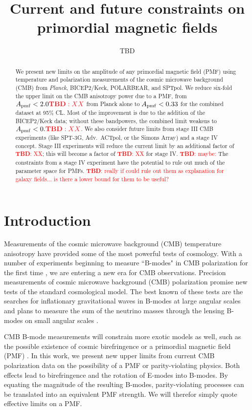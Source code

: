 \documentclass[preprint]{emulateapj}
\newcommand{\apmf}{\ensuremath{A_{\rm pmf}}}
\newcommand{\planck}{{\sl Planck}}
\newcommand{\bicepkeck}{BICEP2/Keck}
\newcommand{\sptnew}{SPT-3G}
\newcommand{\pb}{POLARBEAR}
\newcommand{\simons}{Simons Array}
\newcommand{\sptpol}{SPTpol}
\newcommand{\advactpol}{Adv.~ACTpol}
\newcommand{\tbd}[1]{\textcolor{Red}{{\bf TBD}: #1}}
\begin{document}
\title{Current and future constraints on primordial magnetic fields}
\author{TBD}


\begin{abstract}

We present new limits on the amplitude of any primordial magnetic field (PMF) using temperature and polarization measurements of the cosmic microwave background (CMB)  from \planck{}, \bicepkeck{}, \pb, and \sptpol. 
We reduce six-fold the upper limit on the CMB anisotropy power due to a PMF, from $\apmf < 2.0\tbd{XX}$ from Planck alone to $\apmf < 0.33$ for the combined dataset at 95\% CL. 
Most of the improvement is due to the addition of the \bicepkeck{} data; without these bandpowers, the combined limit weakens to $\apmf < 0.\tbd{XX}$. 
We also consider future limits from stage III CMB experiments (like \sptnew{},  \advactpol, or the \simons) and a stage IV concept. 
Stage III experiments will reduce the current limit by an additional factor of \tbd{XX}; this will become a factor of \tbd{XX} for stage IV. 
\tbd{maybe:} The constraints from a stage IV experiment have the potential to rule out much of the parameter space for PMFs. \tbd{really if could rule out them as explanation for galaxy fields... is there a lower bound for them to be useful?}

\end{abstract}

\section{Introduction}
\label{sec:intro}

Measurements of the cosmic microwave background (CMB) temperature anisotropy have provided some of the most powerful tests of cosmology. 
With a number of experiments beginning to measure  ``B-modes" in CMB polarization for the first time \citep{XXXX}, we are entering a new era for CMB observations. 
Precision measurements of cosmic microwave background (CMB) polarization promise new tests of the standard cosmological model. 
The best known of these tests are the searches for inflationary gravitational waves in B-modes at large angular scales \citep{XXX} and plans to measure the sum of the neutrino masses through the lensing B-modes on small angular scales \citep{XXX}. 

CMB B-mode measurements will constrain more exotic models as well, such as the possible existence of cosmic birefringence \citep{carroll98,lue99} or a primordial magnetic field (PMF) \citep{kosowsky96, seshadri01}.  
In this work, we present new upper limits from current CMB polarization data on the possibility of a PMF or parity-violating physics. 
Both effects lead to birefringence and the rotation of E-modes into B-modes. 
By equating the magnitude of the resulting B-modes, parity-violating processes can be translated into an equivalent PMF strength. 
We will therefor simply quote effective limits on a PMF. 
\end{document}
